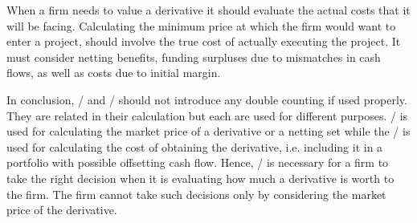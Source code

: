 \documentclass[main.tex]{subfiles}
\begin{document}
    When a firm needs to value a derivative 
    it should evaluate the actual costs that it will be facing.
    Calculating the minimum price at which the firm would want to enter a project,
    should involve the true cost of actually executing the project.
    It must consider netting benefits, funding surpluses due to mismatches in cash flows,
    as well as costs due to initial margin.

    In conclusion, \FVA/ and \DVA/ should not introduce any double counting if used properly.
    They are related in their calculation but each are used for different purposes.
    \DVA/ is used for calculating the market price of a derivative or a netting set
    while the \FVA/ is used for calculating the cost of obtaining the derivative,
    i.e. including it in a portfolio with possible offsetting cash flow.
    Hence, \FVA/ is necessary for a firm to take the right decision when it is evaluating
    how much a derivative is worth to the firm.
    The firm cannot take such decisions only by considering the market price of the derivative.
    
\end{document}
